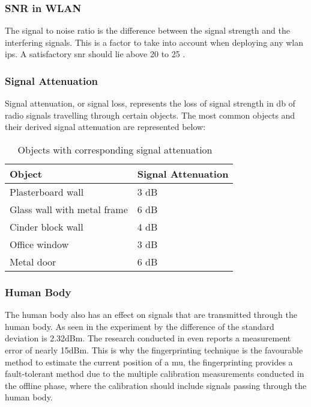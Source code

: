 \subsubsection{SNR in WLAN}
The signal to noise ratio is the difference between the signal strength and the interfering signals. This is a factor to take into account when deploying any \acrshort{wlan} \acrlong{ips}. A satisfactory \acrlong{snr} should lie above 20 to 25 \cite{Hallock2015}.
\subsubsection{Signal Attenuation}
Signal attenuation, or signal loss, represents the loss of signal strength in \acrfull{db} of radio signals travelling through certain objects. The most common objects and their derived signal attenuation are represented below:
\begin{table}[]
\centering
\begin{tabular}{|l|l|}
\hline
\textbf{Object}             & \textbf{Signal Attenuation} \\ \hline
Plasterboard wall           & 3 dB                        \\ \hline
Glass wall with metal frame & 6 dB                        \\ \hline
Cinder block wall           & 4 dB                        \\ \hline
Office window               & 3 dB                        \\ \hline
Metal door                  & 6 dB                        \\ \hline
\end{tabular}
\caption{Objects with corresponding signal attenuation ~\cite[p.99]{Hallock2015}}
\end{table}
\subsubsection{Human Body}
The human body also has an effect on signals that are transmitted through the human body. As seen in the experiment by \cite{S2016} the difference of the standard deviation is 2.32dBm. The research conducted in \cite{Mautz} even reports a measurement error of nearly 15dBm.
This is why the fingerprinting technique is the favourable method to estimate the current position of a \acrlong{mu}, the fingerprinting provides a fault-tolerant method due to the multiple calibration measurements conducted in the offline phase, where the calibration should include signals passing through the human body.
